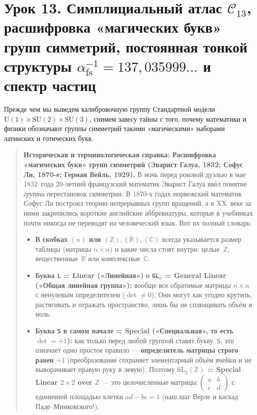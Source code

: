 \section{Урок 13. Симплициальный атлас \texorpdfstring{$\mathcal{C}_{13}$}{C\_13}, расшифровка «магических букв» групп симметрий, постоянная тонкой структуры \texorpdfstring{$\alpha_{\mathrm{fs}}^{-1} = 137{,}035999\dots$}{alpha\^-1 = 137.035999...} и спектр частиц}

Прежде чем мы выведем калибровочную группу Стандартной модели $\mathrm{U}(1)\times\mathrm{SU}(2)\times\mathrm{SU}(3)$, снимем завесу тайны с того, почему математики и физики обозначают группы симметрий такими «магическими» наборами латинских и готических букв.

\begin{quote}
\small\textbf{Историческая и терминологическая справка: Расшифровка «магических букв» групп симметрий (Эварист Галуа, 1832; Софус Ли, 1870-е; Герман Вейль, 1929).}
В ночь перед роковой дуэлью в мае 1832~года 20-летний французский математик Эварист Галуа ввёл понятие \emph{группы} перестановок симметрии. В 1870-х годах норвежский математик Софус Ли построил теорию непрерывных групп вращений, а в XX~веке за ними закрепились короткие английские аббревиатуры, которые в учебниках почти никогда не переводят на человеческий язык. Вот их полный словарь:
\begin{itemize}[noitemsep,leftmargin=*]
\item \textbf{В скобках $(n)$ или $(\mathbb{Z}), (\mathbb{R}), (\mathbb{C})$} всегда указывается размер таблицы (матрицы $n\times n$) и какие числа стоят внутри: целые~$\mathbb{Z}$, вещественные~$\mathbb{R}$ или комплексные~$\mathbb{C}$.
\item \textbf{Буква \texttt{L} = Linear («Линейная»)} и \textbf{\texttt{GL}$_n$ = General Linear («Общая линейная группа»):} вообще все обратимые матрицы $n\times n$ с ненулевым определителем ($\det \ne 0$). Они могут как угодно крутить, растягивать и отражать пространство, лишь бы не сплющивать объём в ноль.
\item \textbf{Буква \texttt{S} в самом начале = Special («Специальная», то есть $\det = +1$):} как только перед любой группой ставят букву~\texttt{S}, это означает одно простое правило --- \textbf{определитель матрицы строго равен $+1$} (преобразование сохраняет элементарный объём ячейки и не выворачивает правую руку в левую). Поэтому \textbf{$\mathrm{SL}_2(\mathbb{Z})$ = Special Linear $2\times 2$ over $\mathbb{Z}$} --- это целочисленные матрицы $\begin{pmatrix} a & b \\ c & d \end{pmatrix}$ с единичной площадью клетки $ad - bc = 1$ (наш шаг Верле и каскад Паде--Минковского!).

\end{itemize}
\end{quote}
